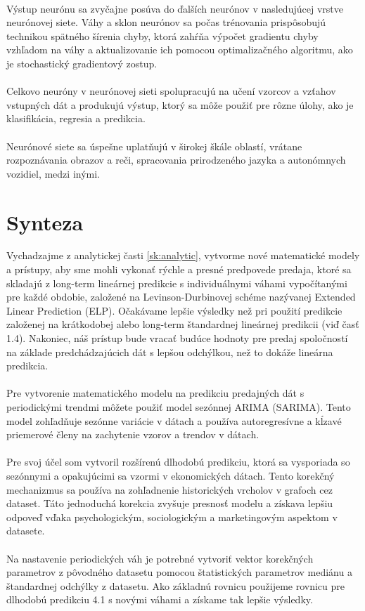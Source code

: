     \\
    Výstup neurónu sa zvyčajne posúva do ďalších neurónov v nasledujúcej vrstve neurónovej siete. Váhy a sklon neurónov sa počas trénovania
    prispôsobujú technikou spätného šírenia chyby, ktorá zahŕňa výpočet gradientu chyby vzhľadom na váhy a aktualizovanie ich pomocou
    optimalizačného algoritmu, ako je stochastický gradientový zostup.\\
    \\
    Celkovo neuróny v neurónovej sieti spolupracujú na učení vzorcov a vzťahov vstupných dát a produkujú výstup, ktorý sa môže použiť pre rôzne
    úlohy, ako je klasifikácia, regresia a predikcia.\\
    \\
    Neurónové siete sa úspešne uplatňujú v širokej škále oblastí, vrátane rozpoznávania obrazov a reči, spracovania prirodzeného
    jazyka a autonómnych vozidiel, medzi inými.
    \section{Synteza}
    Vychadzajme z analytickej časti \ref{sk:analytic}, vytvorme nové matematické modely a prístupy, aby sme mohli vykonať rýchle a presné predpovede predaja,
    ktoré sa skladajú z long-term lineárnej predikcie s individuálnymi váhami vypočítanými pre každé obdobie, založené na Levinson-Durbinovej schéme
    nazývanej Extended Linear Prediction (ELP). Očakávame lepšie výsledky než pri použití predikcie založenej na krátkodobej alebo
    long-term štandardnej lineárnej predikcii (viď časť 1.4). Nakoniec, náš prístup bude vracať budúce hodnoty pre predaj spoločností na základe
    predchádzajúcich dát s lepšou odchýlkou, než to dokáže lineárna predikcia.\\
    \\
    Pre vytvorenie matematického modelu na predikciu predajných dát s periodickými trendmi môžete použiť model sezónnej ARIMA (SARIMA).
    Tento model zohľadňuje sezónne variácie v dátach a používa autoregresívne a kĺzavé priemerové členy na zachytenie vzorov a trendov v dátach.\\
    \\
    Pre svoj účel som vytvoril rozšírenú dlhodobú predikciu, ktorá sa vysporiada so sezónnymi a opakujúcimi sa vzormi v ekonomických dátach.
    Tento korekčný mechanizmus sa používa na zohľadnenie historických vrcholov v grafoch cez dataset. Táto jednoduchá korekcia zvyšuje
    presnosť modelu a získava lepšiu odpoveď vďaka psychologickým, sociologickým a marketingovým aspektom v datasete.\\
    \\
    Na nastavenie periodických váh je potrebné vytvoriť vektor korekčných parametrov z pôvodného datasetu pomocou štatistických parametrov
    mediánu a štandardnej odchýlky z datasetu. Ako základnú rovnicu použijeme rovnicu pre dlhodobú predikciu 4.1 s novými váhami a získame tak lepšie výsledky.
